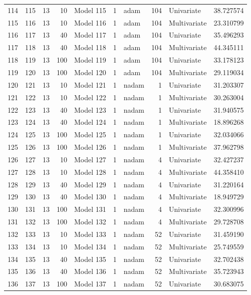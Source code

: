 \begin{tabular}{lrrrlrlrlr}
114 & 115 & 13 & 10 & Model 115 & 1 & adam & 104 & Univariate & 38.727574 \\
115 & 116 & 13 & 10 & Model 116 & 1 & adam & 104 & Multivariate & 23.310799 \\
116 & 117 & 13 & 40 & Model 117 & 1 & adam & 104 & Univariate & 35.496293 \\
117 & 118 & 13 & 40 & Model 118 & 1 & adam & 104 & Multivariate & 44.345111 \\
118 & 119 & 13 & 100 & Model 119 & 1 & adam & 104 & Univariate & 33.178123 \\
119 & 120 & 13 & 100 & Model 120 & 1 & adam & 104 & Multivariate & 29.119034 \\
120 & 121 & 13 & 10 & Model 121 & 1 & nadam & 1 & Univariate & 31.203307 \\
121 & 122 & 13 & 10 & Model 122 & 1 & nadam & 1 & Multivariate & 30.263004 \\
122 & 123 & 13 & 40 & Model 123 & 1 & nadam & 1 & Univariate & 31.940575 \\
123 & 124 & 13 & 40 & Model 124 & 1 & nadam & 1 & Multivariate & 18.896268 \\
124 & 125 & 13 & 100 & Model 125 & 1 & nadam & 1 & Univariate & 32.034066 \\
125 & 126 & 13 & 100 & Model 126 & 1 & nadam & 1 & Multivariate & 37.962798 \\
126 & 127 & 13 & 10 & Model 127 & 1 & nadam & 4 & Univariate & 32.427237 \\
127 & 128 & 13 & 10 & Model 128 & 1 & nadam & 4 & Multivariate & 44.358410 \\
128 & 129 & 13 & 40 & Model 129 & 1 & nadam & 4 & Univariate & 31.220164 \\
129 & 130 & 13 & 40 & Model 130 & 1 & nadam & 4 & Multivariate & 18.949729 \\
130 & 131 & 13 & 100 & Model 131 & 1 & nadam & 4 & Univariate & 32.300996 \\
131 & 132 & 13 & 100 & Model 132 & 1 & nadam & 4 & Multivariate & 29.728708 \\
132 & 133 & 13 & 10 & Model 133 & 1 & nadam & 52 & Univariate & 31.459190 \\
133 & 134 & 13 & 10 & Model 134 & 1 & nadam & 52 & Multivariate & 25.749559 \\
134 & 135 & 13 & 40 & Model 135 & 1 & nadam & 52 & Univariate & 32.702438 \\
135 & 136 & 13 & 40 & Model 136 & 1 & nadam & 52 & Multivariate & 35.723943 \\
136 & 137 & 13 & 100 & Model 137 & 1 & nadam & 52 & Univariate & 30.683075 \\

\end{tabular}

